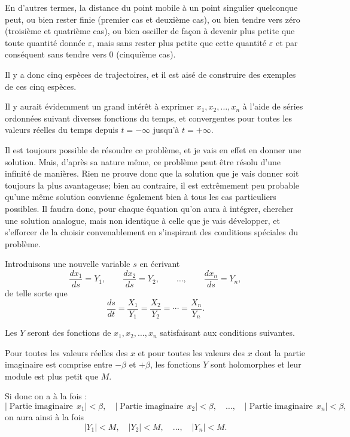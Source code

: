 \documentclass[11pt]{article}
\begin{document}
En d’autres termes, la distance du point mobile à un point singulier quelconque peut, ou bien rester finie (premier cas et deuxième cas), ou bien tendre vers zéro (troisième et quatrième cas), ou bien osciller de façon à devenir plus petite que toute quantité donnée $\varepsilon$, mais sans rester plus petite que cette quantité $\varepsilon$ et par conséquent sans tendre vers 0 (cinquième cas).

Il y a donc cinq espèces de trajectoires, et il est aisé de construire des exemples de ces cinq espèces.

Il y aurait évidemment un grand intérêt à exprimer $x_1,x_2,\ldots,x_n$ à l’aide de séries ordonnées suivant diverses fonctions du temps, et convergentes pour toutes les valeurs réelles du temps depuis $t=-\infty$ jusqu’à $t=+\infty$.

Il est toujours possible de résoudre ce problème, et je vais en effet en donner une solution. Mais, d’après sa nature même, ce problème peut être résolu d’une infinité de manières. Rien ne prouve donc que la solution que je vais donner soit toujours la plus avantageuse; bien au contraire, il est extrêmement peu probable qu’une même solution convienne également bien à tous les cas particuliers possibles. Il faudra donc, pour chaque équation qu’on aura à intégrer, chercher une solution analogue, mais non identique à celle que je vais développer, et s’efforcer de la choisir convenablement en s’inspirant des conditions spéciales du problème.

Introduisons une nouvelle variable $s$ en écrivant
\begin{equation}
\frac{dx_1}{ds}=Y_1,\qquad \frac{dx_2}{ds}=Y_2,\qquad \ldots,\qquad \frac{dx_n}{ds}=Y_n,
\tag{2}
\end{equation}
de telle sorte que
\[
\frac{ds}{dt}=\frac{X_1}{Y_1}=\frac{X_2}{Y_2}=\cdots=\frac{X_n}{Y_n}.
\]

Les $Y$ seront des fonctions de $x_1,x_2,\ldots,x_n$ satisfaisant aux conditions suivantes.

Pour toutes les valeurs réelles des $x$ et pour toutes les valeurs des $x$ dont la partie imaginaire est comprise entre $-\beta$ et $+\beta$, les fonctions $Y$ sont holomorphes et leur module est plus petit que $M$.

Si donc on a à la fois :
\[
|\operatorname{Partie\ imaginaire}\,x_1|<\beta,
\quad |\operatorname{Partie\ imaginaire}\,x_2|<\beta,
\quad \ldots,
\quad |\operatorname{Partie\ imaginaire}\,x_n|<\beta,
\]
on aura ainsi à la fois
\[
|Y_1|<M,
\quad |Y_2|<M,
\quad \ldots,
\quad |Y_n|<M.
\]
\end{document}
